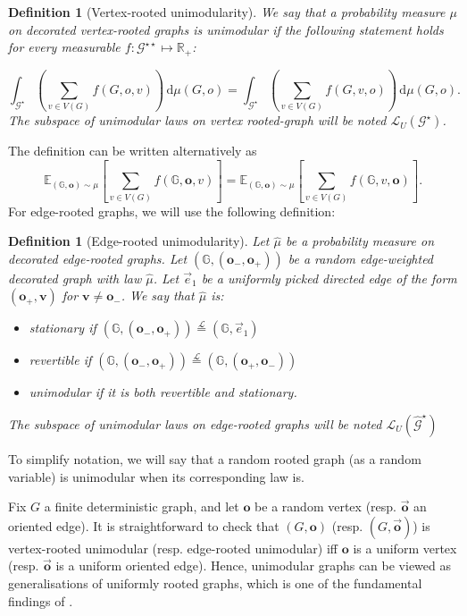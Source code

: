 \documentclass[11pt]{article}
\newtheorem{definition}[prop]{Definition}
\begin{document}
\begin{definition}[Vertex-rooted unimodularity]
We say that a probability measure $\mu$ on decorated vertex-rooted graphs is unimodular if the following statement holds for every measurable $f : \mathcal{G}^{\star\star} \mapsto \mathbb{R}_+$:
     
    \[
    \int_{\mathcal G^{\star}} \left( \sum_{v \in V(G)} f(G,o,v)  \right) \, 
    \mathrm{d} \mu (G,o)
     = \int_{\mathcal G^{\star}} \left( \sum_{v \in V(G)} f(G,v,o)  \right) \, 
    \mathrm{d} \mu (G,o)   .\]
    The subspace of unimodular laws on vertex rooted-graph will be noted $\mathcal{L}_U(\mathcal{G}^{\star})$.
\end{definition}
The definition can be written alternatively as 
\[ \mathbb{E}_{(\mathbb{G},\mathbf{o}) \sim \mu  } \left[\sum_{v \in V(G)} f(\mathbb{G},\mathbf{o},v)\right]=\mathbb{E}_{(\mathbb{G},\mathbf{o}) \sim \mu }\left[\sum_{v \in V(G)} f(\mathbb{G},v,\mathbf{o})\right].    \]
For edge-rooted graphs, we will use the following definition: 
\begin{definition}[Edge-rooted unimodularity]
    Let $\hat{\mu}$ be a probability measure on decorated edge-rooted graphs.
    Let $(\mathbb{G},(\mathbf{o}_-,\mathbf{o}_+))$ be a random edge-weighted decorated graph with law $\hat \mu$. Let $\overset{\rightarrow}{e}_1$ be a uniformly picked directed edge of the form $(\mathbf{o}_+,\mathbf{v})$ for $\mathbf{v} \neq \mathbf{o}_-$. 
    We say that $\hat{\mu}$ is:
    \begin{itemize}
    \item stationary if $(\mathbb{G},(\mathbf{o}_-,\mathbf{o}_+))\overset{\mathcal{L}}{=}(\mathbb{G},\overset{\rightarrow}{e}_1)$
    \item revertible if $(\mathbb{G},(\mathbf{o}_-,\mathbf{o}_+))\overset{\mathcal{L}}{=}(\mathbb{G},(\mathbf{o}_+,\mathbf{o}_-))$ 
    \item unimodular if it is both revertible and stationary.
    \end{itemize}
    The subspace of unimodular laws on edge-rooted graphs will be noted $\mathcal{L}_U(\hat{\mathcal{G}}^{\star})$
\end{definition}


To simplify notation, we will say that a random rooted graph (as a random variable) is unimodular when its corresponding law is. 

\begin{remark}
    Fix $G$ a finite deterministic graph, and let $\mathbf o$ be a random vertex (resp.  $\overset{\rightarrow}{\mathbf o}$ an oriented edge). It is straightforward to check that $(G,\mathbf o)$ (resp. $(G,\overset{\rightarrow}{\mathbf o})$) is vertex-rooted unimodular (resp. edge-rooted unimodular) iff $\mathbf o$ is a uniform vertex (resp. $\overset{\rightarrow}{\mathbf o}$ is a uniform oriented edge). Hence, unimodular graphs can be viewed as generalisations of uniformly rooted graphs, which is one of the fundamental findings of \cite{BenjaminiSchramm1}. 
\end{remark}
\end{document}
